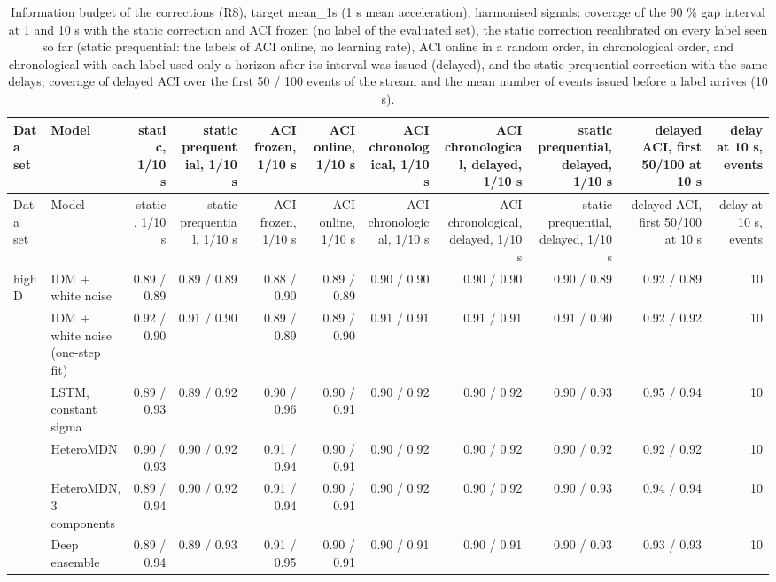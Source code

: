 \begin{longtable}{llrrrrrrrrr}
\caption{Information budget of the corrections (R8), target mean\_1s (1 s mean acceleration), harmonised signals: coverage of the 90 \% gap interval at 1 and 10 s with the static correction and ACI frozen (no label of the evaluated set), the static correction recalibrated on every label seen so far (static prequential: the labels of ACI online, no learning rate), ACI online in a random order, in chronological order, and chronological with each label used only a horizon after its interval was issued (delayed), and the static prequential correction with the same delays; coverage of delayed ACI over the first 50 / 100 events of the stream and the mean number of events issued before a label arrives (10 s).}\label{tab:t4-info-budget--harmonised--mean-1s} \\
\toprule
Data set & Model & static, 1/10 s & static prequential, 1/10 s & ACI frozen, 1/10 s & ACI online, 1/10 s & ACI chronological, 1/10 s & ACI chronological, delayed, 1/10 s & static prequential, delayed, 1/10 s & delayed ACI, first 50/100 at 10 s & delay at 10 s, events \\
\midrule
\endfirsthead
\toprule
Data set & Model & static, 1/10 s & static prequential, 1/10 s & ACI frozen, 1/10 s & ACI online, 1/10 s & ACI chronological, 1/10 s & ACI chronological, delayed, 1/10 s & static prequential, delayed, 1/10 s & delayed ACI, first 50/100 at 10 s & delay at 10 s, events \\
\midrule
\endhead
\bottomrule
\endlastfoot
highD & IDM + white noise & 0.89 / 0.89 & 0.89 / 0.89 & 0.88 / 0.90 & 0.89 / 0.89 & 0.90 / 0.90 & 0.90 / 0.90 & 0.90 / 0.89 & 0.92 / 0.89 & 10 \\
 & IDM + white noise (one-step fit) & 0.92 / 0.90 & 0.91 / 0.90 & 0.89 / 0.89 & 0.89 / 0.90 & 0.91 / 0.91 & 0.91 / 0.91 & 0.91 / 0.90 & 0.92 / 0.92 & 10 \\
 & LSTM, constant sigma & 0.89 / 0.93 & 0.89 / 0.92 & 0.90 / 0.96 & 0.90 / 0.91 & 0.90 / 0.92 & 0.90 / 0.92 & 0.90 / 0.93 & 0.95 / 0.94 & 10 \\
 & HeteroMDN & 0.90 / 0.93 & 0.90 / 0.92 & 0.91 / 0.94 & 0.90 / 0.91 & 0.90 / 0.92 & 0.90 / 0.92 & 0.90 / 0.92 & 0.92 / 0.92 & 10 \\
 & HeteroMDN, 3 components & 0.89 / 0.94 & 0.90 / 0.92 & 0.91 / 0.94 & 0.90 / 0.91 & 0.90 / 0.92 & 0.90 / 0.92 & 0.90 / 0.93 & 0.94 / 0.94 & 10 \\
 & Deep ensemble & 0.89 / 0.94 & 0.89 / 0.93 & 0.91 / 0.95 & 0.90 / 0.91 & 0.90 / 0.91 & 0.90 / 0.91 & 0.90 / 0.93 & 0.93 / 0.93 & 10 \\

\end{longtable}
